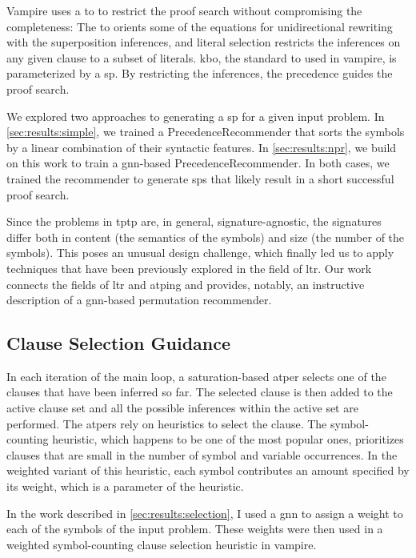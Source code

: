 Vampire uses a \gls{to} to restrict the proof search without compromising the completeness:
The \gls{to} orients some of the equations for unidirectional rewriting with the superposition inferences,
and literal selection restricts the inferences on any given clause to a subset of literals.
\Gls{kbo}, the standard \gls{to} used in \gls{vampire}, is parameterized by a \gls{sp}.
By restricting the inferences, the precedence guides the proof search.

We explored two approaches to generating a \gls{sp} for a given input problem.
In \cref{sec:results:simple}, we trained a \gls{PrecedenceRecommender} that sorts the symbols by a linear combination of their syntactic features.
In \cref{sec:results:npr}, we build on this work to train a \acrshort{gnn}-based \gls{PrecedenceRecommender}.
In both cases, we trained the recommender to generate \glspl{sp} that likely result in a short successful proof search.

Since the problems in \gls{tptp} are, in general, signature-agnostic,
the signatures differ both in content (the semantics of the symbols) and size (the number of the symbols).
This poses an unusual design challenge,
which finally led us to apply techniques that have been previously explored in the field of \gls{ltr}.
Our work connects the fields of \gls{ltr} and \gls{atping} and provides, notably, an instructive description of a \acrshort{gnn}-based permutation recommender.

\subsection{Clause Selection Guidance}
\label{sec:contrib:ClauseSelection}

In each iteration of the main loop,
a saturation-based \gls{atper} selects one of the clauses that have been inferred so far.
The selected clause is then added to the active clause set and all the possible inferences within the active set are performed.
The \glspl{atper} rely on heuristics to select the clause.
The symbol-counting heuristic, which happens to be one of the most popular ones,
prioritizes clauses that are small in the number of symbol and variable occurrences.
In the weighted variant of this heuristic,
each symbol contributes an amount specified by its weight,
which is a parameter of the heuristic.

In the work described in \cref{sec:results:selection},
I used a \gls{gnn} to assign a weight to each of the symbols of the input problem.
These weights were then used in a weighted symbol-counting clause selection heuristic in \gls{vampire}.


